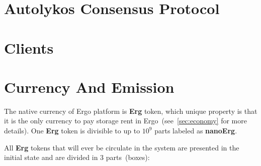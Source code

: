 \documentclass[]{article}
\newcommand{\Ergo}{Ergo}
\newcommand{\Erg}{\textbf{Erg}}
\newcommand{\nanoErg}{\textbf{nanoErg}}
\begin{document}
    \section{Autolykos Consensus Protocol}
    \label{sec:autolykos}


    \section{Clients}



    \section{Currency And Emission}


    The native currency of \Ergo{} platform is \Erg{} token, which unique property is
    that it is the only currency to pay storage rent in \Ergo{}~(see~\ref{sec:economy} for more details).
    One \Erg{} token is divisible to up to $10^9$ parts labeled as \nanoErg{}.

    All \Erg{} tokens that will ever be circulate in the system are presented in the
    initial state and are divided in 3 parts~(boxes):
\end{document}
